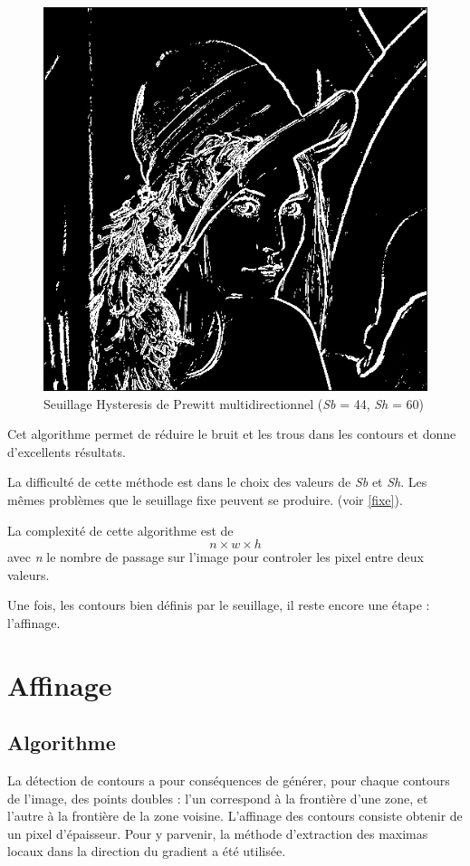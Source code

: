 \documentclass[11pt]{article}
\begin{document}
	\begin{figure}[H]
		\centering
		\includegraphics[scale=0.25]{Image/seuilHysteresis.png}
		\caption{Seuillage Hysteresis de Prewitt multidirectionnel	(\textit{Sb} = 44, \textit{Sh} = 60)}
		\label{fig:seuilHysteresis}
	\end{figure} 



	Cet algorithme permet de réduire le bruit et les trous dans les contours et donne d'excellents résultats.

	La difficulté de cette méthode est dans le choix des valeurs de \textit{Sb} et \textit{Sh}.
	Les mêmes problèmes que le seuillage fixe peuvent se produire. (voir \ref{fixe}).

	La complexité de cette algorithme est de \[n \times w \times h\]
	avec \textit{n} le nombre de passage sur l'image pour controler les pixel entre deux valeurs.

	Une fois, les contours bien définis par le seuillage, il reste encore une étape : l'affinage.


\section{Affinage}

	\subsection{Algorithme}
		La détection de contours a pour conséquences de générer, pour chaque contours de l'image, des points doubles : l'un correspond à la frontière d'une zone, et l'autre à la frontière de la zone voisine. 
		L'affinage des contours consiste obtenir de un pixel d'épaisseur. 
		Pour y parvenir, la méthode d'extraction des maximas locaux dans la direction du gradient a été utilisée.
\end{document}
